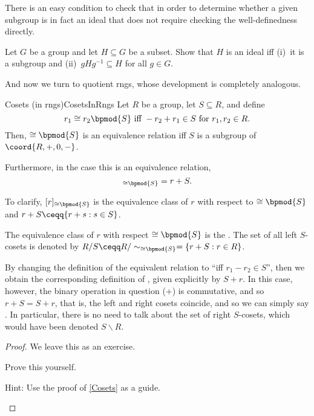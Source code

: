 There is an easy condition to check that in order to determine whether a given subgroup is in fact an ideal that does not require checking the well-definedness directly.
\begin{exr}{}{}
Let $G$ be a group and let $H\subseteq G$ be a subset.  Show that $H$ is an ideal iff (i)~it is a subgroup and (ii)~$gHg^{-1}\subseteq H$ for all $g\in G$.
\end{exr}

And now we turn to quotient rngs, whose development is completely analogous.
\begin{prp}{Cosets (in rngs)}{CosetsInRngs}
Let $R$ be a group, let $S\subseteq R$, and define
\begin{equation}
r_1\cong r_2\bpmod{S}\text{ iff }-r_2+r_1\in S\text{ for }r_1,r_2\in R.
\end{equation}
Then, $\cong \bpmod{S}$ is an equivalence relation iff $S$ is a subgroup of $\coord{R,+,0,-}$.

Furthermore, in the case this is an equivalence relation,
\begin{equation}
[r]_{\cong \bpmod{S}}=r+S.
\end{equation}
\begin{rmk}
To clarify, $[r]_{\cong \bpmod{S}}$ is the equivalence class of $r$ with respect to $\cong \bpmod{S}$ and $r+S\ceqq \{ r+s:s\in S\}$.
\end{rmk}
\begin{rmk}
The equivalence class of $r$ with respect $\cong \bpmod{S}$ is the .  The set of all left $S$-cosets is denoted by $R/S\ceqq R/\sim _{\cong \bpmod{S}}=\left\{ r+S:r\in R\right\}$.
\end{rmk}
\begin{rmk}
By changing the definition of the equivalent relation to ``\textellipsis iff $r_1-r_2\in S$'', then we obtain the corresponding definition of , given explicitly by $S+r$.  In this case, however, the binary operation in question ($+$) is commutative, and so $r+S=S+r$, that is, the left and right cosets coincide, and so we can simply say .  In particular, there is no need to talk about the set of right $S$-cosets, which would have been denoted $S\backslash R$.
\end{rmk}
\begin{proof}
We leave this as an exercise.
\begin{exr}[breakable=false]{}{}
Prove this yourself.
\begin{rmk}
Hint:  Use the proof of \cref{Cosets} as a guide.
\end{rmk}
\end{exr}
\end{proof}
\end{prp}
